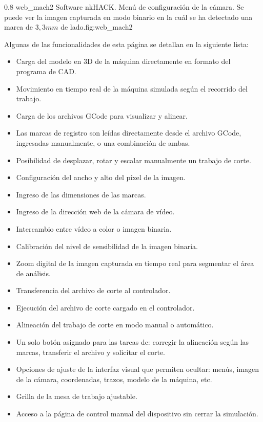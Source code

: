 \subfiga
{0.8} {web_mach2} {Software nkHACK. Menú de configuración de la cámara. Se puede ver la imagen capturada en modo binario en la cuál se ha detectado una marca de $3,3 mm$ de lado.}{fig:web_mach2}

Algunas de las funcionalidades de esta página se detallan en la siguiente lista:
\begin{itemize}
   \item{Carga del modelo en 3D de la máquina directamente en formato del programa de CAD.}
   \item{Movimiento en tiempo real de la máquina simulada según el recorrido del trabajo.}
   \item{Carga de los archivos GCode para visualizar y alinear.}
   \item{Las marcas de registro son leídas directamente desde el archivo GCode, ingresadas manualmente, o una combinación de ambas.}
   \item{Posibilidad de desplazar, rotar y escalar manualmente un trabajo de corte.}
   \item{Configuración del ancho y alto del píxel de la imagen.}
   \item{Ingreso de las dimensiones de las marcas.}
   \item{Ingreso de la dirección web de la cámara de vídeo.}
   \item{Intercambio entre vídeo a color o imagen binaria.}
   \item{Calibración del nivel de sensibilidad de la imagen binaria.}
   \item{Zoom digital de la imagen capturada en tiempo real para segmentar el área de análisis.}
   \item{Transferencia del archivo de corte al controlador.}
   \item{Ejecución del archivo de corte cargado en el controlador.}
   \item{Alineación del trabajo de corte en modo manual o automático.}
   \item{Un solo botón asignado para las tareas de: corregir la alineación según las marcas, transferir el archivo y solicitar el corte.}
   \item{Opciones de ajuste de la interfaz visual que permiten ocultar: menús, imagen de la cámara, coordenadas, trazos, modelo de la máquina, etc.}
   \item{Grilla de la mesa de trabajo ajustable.}
   \item{Acceso a la página de control manual del dispositivo sin cerrar la simulación.}
\end{itemize}


